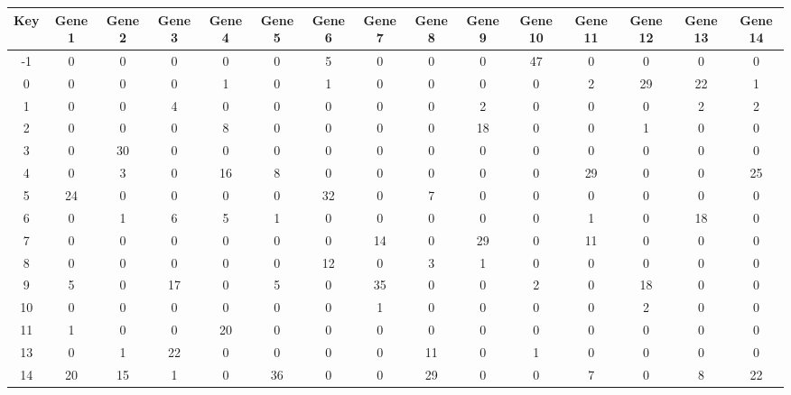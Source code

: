\begin{tabular}{|c|c|c|c|c|c|c|c|c|c|c|c|c|c|c|}
\hline
Key & Gene 1 & Gene 2 & Gene 3 & Gene 4 & Gene 5 & Gene 6 & Gene 7 & Gene 8 & Gene 9 & Gene 10 & Gene 11 & Gene 12 & Gene 13 & Gene 14 \\
\hline
-1 & 0 & 0 & 0 & 0 & 0 & 5 & 0 & 0 & 0 & 47 & 0 & 0 & 0 & 0 \\
0 & 0 & 0 & 0 & 1 & 0 & 1 & 0 & 0 & 0 & 0 & 2 & 29 & 22 & 1 \\
1 & 0 & 0 & 4 & 0 & 0 & 0 & 0 & 0 & 2 & 0 & 0 & 0 & 2 & 2 \\
2 & 0 & 0 & 0 & 8 & 0 & 0 & 0 & 0 & 18 & 0 & 0 & 1 & 0 & 0 \\
3 & 0 & 30 & 0 & 0 & 0 & 0 & 0 & 0 & 0 & 0 & 0 & 0 & 0 & 0 \\
4 & 0 & 3 & 0 & 16 & 8 & 0 & 0 & 0 & 0 & 0 & 29 & 0 & 0 & 25 \\
5 & 24 & 0 & 0 & 0 & 0 & 32 & 0 & 7 & 0 & 0 & 0 & 0 & 0 & 0 \\
6 & 0 & 1 & 6 & 5 & 1 & 0 & 0 & 0 & 0 & 0 & 1 & 0 & 18 & 0 \\
7 & 0 & 0 & 0 & 0 & 0 & 0 & 14 & 0 & 29 & 0 & 11 & 0 & 0 & 0 \\
8 & 0 & 0 & 0 & 0 & 0 & 12 & 0 & 3 & 1 & 0 & 0 & 0 & 0 & 0 \\
9 & 5 & 0 & 17 & 0 & 5 & 0 & 35 & 0 & 0 & 2 & 0 & 18 & 0 & 0 \\
10 & 0 & 0 & 0 & 0 & 0 & 0 & 1 & 0 & 0 & 0 & 0 & 2 & 0 & 0 \\
11 & 1 & 0 & 0 & 20 & 0 & 0 & 0 & 0 & 0 & 0 & 0 & 0 & 0 & 0 \\
13 & 0 & 1 & 22 & 0 & 0 & 0 & 0 & 11 & 0 & 1 & 0 & 0 & 0 & 0 \\
14 & 20 & 15 & 1 & 0 & 36 & 0 & 0 & 29 & 0 & 0 & 7 & 0 & 8 & 22 \\
\hline
\end{tabular}